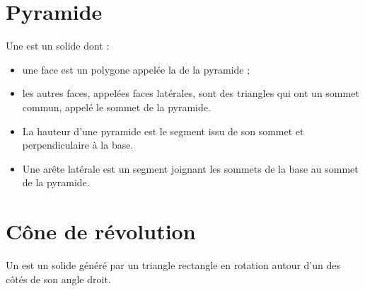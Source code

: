 
\section{Pyramide}

\begin{definition}
    Une  est un solide dont :
    \begin{itemize}
        \item 
            une face est un polygone appelée la  de la pyramide ;
\item
les autres faces, appelées faces latérales, sont des triangles qui ont un sommet commun, appelé le sommet de la pyramide.
    \end{itemize}
\end{definition}


\begin{definition}
    \begin{itemize}
        \item 
La hauteur d'une pyramide est le segment issu de son sommet et perpendiculaire à la base.
\item
Une arête latérale est un segment joignant les sommets de la base au sommet de la pyramide.
    \end{itemize}
\end{definition}



\section{Cône de révolution}

\begin{definition}
    Un  est un solide généré par un triangle rectangle en rotation autour d'un des côtés de son angle droit.
\end{definition}



